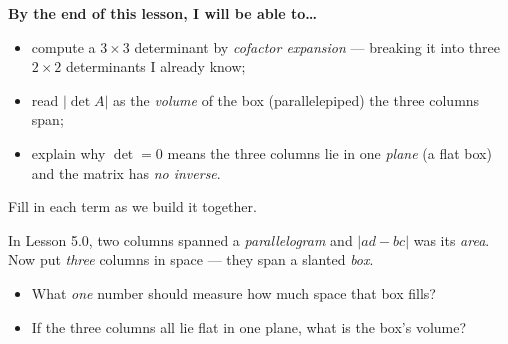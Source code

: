 \documentclass[10pt]{article}
\begin{document}
\namedateperiod

\vspace{0.12in}

\begin{objectivebox}
\textbf{By the end of this lesson, I will be able to\dots}
\begin{itemize}\setlength{\itemsep}{2pt}
  \item compute a $3\times3$ determinant by \emph{cofactor expansion} --- breaking it into three $2\times2$ determinants I already know;
  \item read $|\det A|$ as the \emph{volume} of the box (parallelepiped) the three columns span;
  \item explain why $\det=0$ means the three columns lie in one \emph{plane} (a flat box) and the matrix has \emph{no inverse}.
\end{itemize}
\end{objectivebox}

\vspace{0.06in}

\begin{vocabbox}
\small
Fill in each term as we build it together.
\vspace{2pt}
\end{vocabbox}

\begin{hookbox}
In Lesson 5.0, two columns spanned a \emph{parallelogram} and $|ad-bc|$ was its \emph{area}. Now put
\emph{three} columns in space --- they span a slanted \emph{box}.
\begin{itemize}\setlength{\itemsep}{1pt}
  \item What \emph{one} number should measure how much space that box fills? \writeline
  \item If the three columns all lie flat in one plane, what is the box's volume? \writeline
\end{itemize}
\end{hookbox}
\end{document}

